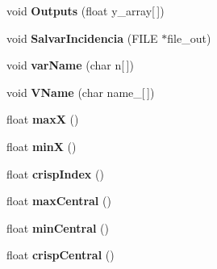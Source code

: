 \begin{DoxyCompactItemize}
\item 
\hypertarget{classMOFSVar_a98639a044102a40c1987d6bc210af810}{void {\bfseries Outputs} (float y\-\_\-array\mbox{[}$\,$\mbox{]})}\label{classMOFSVar_a98639a044102a40c1987d6bc210af810}

\item 
\hypertarget{classMOFSVar_adca91ca005e24ab1a4a567825900fe77}{void {\bfseries Salvar\-Incidencia} (F\-I\-L\-E $\ast$file\-\_\-out)}\label{classMOFSVar_adca91ca005e24ab1a4a567825900fe77}

\item 
\hypertarget{classMOFSVar_a01c78618b9ea839126f6f43e13fe14ad}{void {\bfseries var\-Name} (char n\mbox{[}$\,$\mbox{]})}\label{classMOFSVar_a01c78618b9ea839126f6f43e13fe14ad}

\item 
\hypertarget{classMOFSVar_affaa2187bfe2c3cc050ebc98f4a37fa5}{void {\bfseries V\-Name} (char name\-\_\-\mbox{[}$\,$\mbox{]})}\label{classMOFSVar_affaa2187bfe2c3cc050ebc98f4a37fa5}

\item 
\hypertarget{classMOFSVar_ae319b92509497de3c107fe1e08a66aa4}{float {\bfseries max\-X} ()}\label{classMOFSVar_ae319b92509497de3c107fe1e08a66aa4}

\item 
\hypertarget{classMOFSVar_a009bde4800d2a429fd9ab29f5eab871a}{float {\bfseries min\-X} ()}\label{classMOFSVar_a009bde4800d2a429fd9ab29f5eab871a}

\item 
\hypertarget{classMOFSVar_a989c45b4550f4c5875844d6a2b10725f}{float {\bfseries crisp\-Index} ()}\label{classMOFSVar_a989c45b4550f4c5875844d6a2b10725f}

\item 
\hypertarget{classMOFSVar_a205d8fff6a84dd1d0179bd5009015da4}{float {\bfseries max\-Central} ()}\label{classMOFSVar_a205d8fff6a84dd1d0179bd5009015da4}

\item 
\hypertarget{classMOFSVar_aadeab56000d1f8b793b8069f6d2346d1}{float {\bfseries min\-Central} ()}\label{classMOFSVar_aadeab56000d1f8b793b8069f6d2346d1}

\item 
\hypertarget{classMOFSVar_a39057c75b7a24489606b8f0702308053}{float {\bfseries crisp\-Central} ()}\label{classMOFSVar_a39057c75b7a24489606b8f0702308053}

\end{DoxyCompactItemize}


